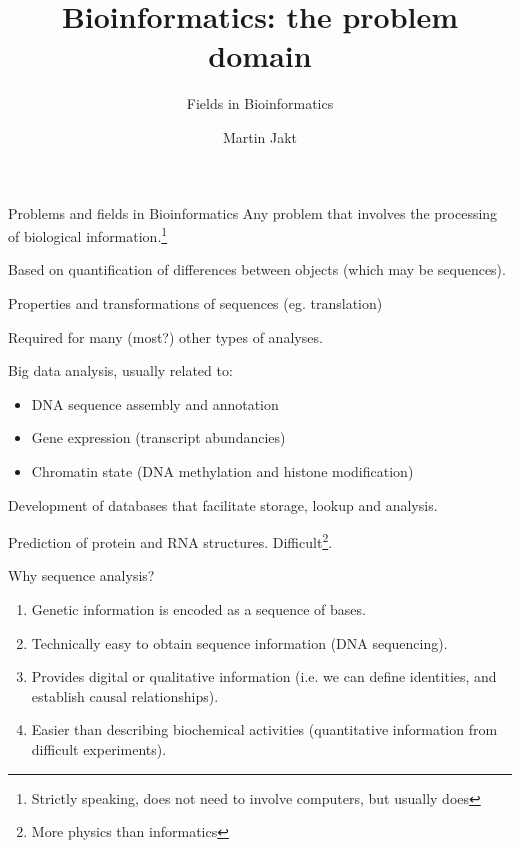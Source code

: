 \documentclass[pdf]{beamer}
\title{Bioinformatics: the problem domain}
\subtitle{Fields in Bioinformatics}
\author{Martin Jakt}
\begin{document}
\begin{frame}
  \titlepage
\end{frame}

\begin{frame}{Problems and fields in Bioinformatics}
  \small
  Any problem that involves the processing of biological information.\footnote
  {Strictly speaking, does not need to involve computers, but usually does}

  \begin{description}
    \item<2->[Phylogeny] Based on quantification of differences between objects (which
      may be sequences).
    \item<3->[Sequence analysis] Properties and transformations of sequences (eg. translation)
    \item<4->[Sequence alignment] Required for many (most?) other types of analyses.
    \item<5->[Omics] Big data analysis, usually related to:
      \begin{itemize}
        \item<5-> DNA sequence assembly and annotation
        \item<5-> Gene expression (transcript abundancies)
        \item<5-> Chromatin state (DNA methylation and histone modification)
      \end{itemize}
    \item<6->[Databases] Development of databases that facilitate storage, lookup and analysis.
    \item<7->[Structures] Prediction of protein and RNA structures.
      Difficult\footnote{More physics than informatics}.
  \end{description}

\end{frame}

\begin{frame}{Why sequence analysis?}
  \begin{enumerate}
    \item Genetic information is encoded as a sequence of bases.
    \item Technically easy to obtain sequence information (DNA sequencing).
    \item Provides digital or qualitative information (i.e. we can define
      identities, and establish causal relationships).
    \item Easier than describing biochemical activities (quantitative information
      from difficult experiments).
  \end{enumerate}
\end{frame}
\end{document}
